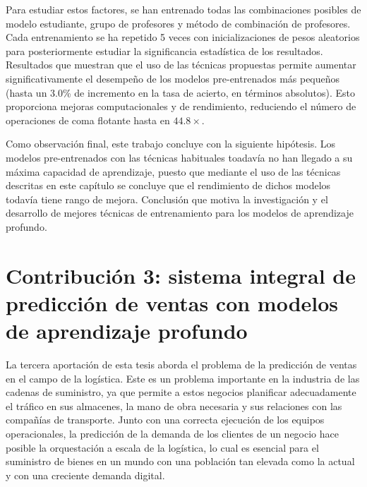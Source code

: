 Para estudiar estos factores, se han entrenado todas las combinaciones posibles de modelo estudiante, grupo de profesores y método de combinación de profesores. Cada entrenamiento se ha repetido 5 veces con inicializaciones de pesos aleatorios para posteriormente estudiar la significancia estadística de los resultados. Resultados que muestran que el uso de las técnicas propuestas permite aumentar significativamente el desempeño de los modelos pre-entrenados más pequeños (hasta un 3.0\% de incremento en la tasa de acierto, en términos absolutos). Esto proporciona mejoras computacionales y de rendimiento, reduciendo el número de operaciones de coma flotante hasta en $44.8\times$. 

Como observación final, este trabajo concluye con la siguiente hipótesis. Los modelos pre-entrenados con las técnicas habituales toadavía no han llegado a su máxima capacidad de aprendizaje, puesto que mediante el uso de las técnicas descritas en este capítulo se concluye que el rendimiento de dichos modelos todavía tiene rango de mejora. Conclusión que motiva la investigación y el desarrollo de mejores técnicas de entrenamiento para los modelos de aprendizaje profundo.



\section*{Contribución 3: sistema integral de predicción de ventas con modelos de aprendizaje profundo}
La tercera aportación de esta tesis aborda el problema de la predicción de ventas en el campo de la logística. Este es un problema importante en la industria de las cadenas de suministro, ya que permite a estos negocios planificar adecuadamente el tráfico en sus almacenes, la mano de obra necesaria y sus relaciones con las compañías de transporte. Junto con una correcta ejecución de los equipos operacionales, la predicción de la demanda de los clientes de un negocio hace posible la orquestación a escala de la logística, lo cual es esencial para el suministro de bienes en un mundo con una población tan elevada como la actual y con una creciente demanda digital.

